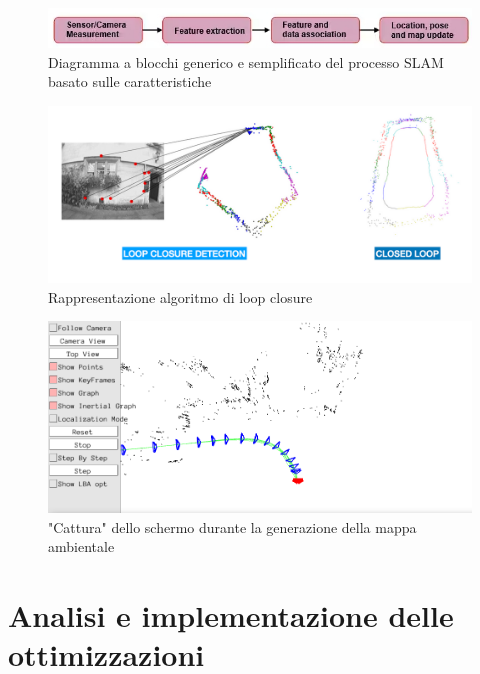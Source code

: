 \documentclass[12pt,a4paper]{report}
\begin{document}
\begin{figure}[H]
    \centering
    \includegraphics[width=1\linewidth]{img/SLAM_schema.jpg}
    \caption{Diagramma a blocchi generico e semplificato del processo SLAM basato sulle caratteristiche \cite{SLAM_algoritm2}}
\end{figure}

\begin{figure}[H]
    \centering
    \includegraphics[width=1\linewidth]{img/loop_closure.png}
    \caption{Rappresentazione algoritmo di loop closure \cite{loop_closure}}
    
\end{figure}

\begin{figure}[H]
    \centering
    \includegraphics[width=1\linewidth]{img/map_viewer.png}
    \caption{"Cattura" dello schermo durante la generazione della mappa ambientale}
\end{figure}




\chapter{Analisi e implementazione delle ottimizzazioni}
\end{document}
